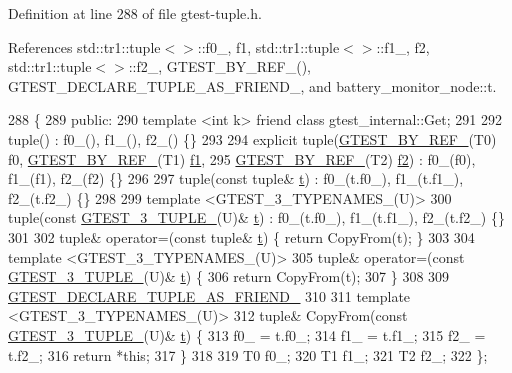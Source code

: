 Definition at line 288 of file gtest-\/tuple.\+h.



References std\+::tr1\+::tuple$<$$>$\+::f0\+\_\+, f1, std\+::tr1\+::tuple$<$$>$\+::f1\+\_\+, f2, std\+::tr1\+::tuple$<$$>$\+::f2\+\_\+, G\+T\+E\+S\+T\+\_\+\+B\+Y\+\_\+\+R\+E\+F\+\_\+(), G\+T\+E\+S\+T\+\_\+\+D\+E\+C\+L\+A\+R\+E\+\_\+\+T\+U\+P\+L\+E\+\_\+\+A\+S\+\_\+\+F\+R\+I\+E\+N\+D\+\_\+, and battery\+\_\+monitor\+\_\+node\+::t.


\begin{DoxyCode}
288                         \{
289  \textcolor{keyword}{public}:
290   \textcolor{keyword}{template} <\textcolor{keywordtype}{int} k> \textcolor{keyword}{friend} \textcolor{keyword}{class }gtest\_internal::Get;
291 
292   tuple() : f0\_(), f1\_(), f2\_() \{\}
293 
294   \textcolor{keyword}{explicit} tuple(\hyperlink{gtest-tuple_8h_adcf9057737a411d833fac0382c13a181}{GTEST\_BY\_REF\_}(T0) f0, \hyperlink{gtest-tuple_8h_adcf9057737a411d833fac0382c13a181}{GTEST\_BY\_REF\_}(T1) 
      \hyperlink{namespacestd_1_1tr1_a9c0fa65b105f8e2f58ba59ecf75fd000}{f1},
295       \hyperlink{gtest-tuple_8h_adcf9057737a411d833fac0382c13a181}{GTEST\_BY\_REF\_}(T2) \hyperlink{namespacestd_1_1tr1_a87dd9e009868361317f587126dba63d4}{f2}) : f0\_(f0), f1\_(f1), f2\_(f2) \{\}
296 
297   tuple(\textcolor{keyword}{const} tuple& \hyperlink{namespacebattery__monitor__node_a7a63d20d1ea461e280f4eb5b47f925cd}{t}) : f0\_(t.f0\_), f1\_(t.f1\_), f2\_(t.f2\_) \{\}
298 
299   \textcolor{keyword}{template} <GTEST\_3\_TYPENAMES\_(U)>
300   tuple(\textcolor{keyword}{const} \hyperlink{gtest-tuple_8h_af2c3eab3f1a5197b408fce44eb3ed9da}{GTEST\_3\_TUPLE\_}(U)& \hyperlink{namespacebattery__monitor__node_a7a63d20d1ea461e280f4eb5b47f925cd}{t}) : f0\_(t.f0\_), f1\_(t.f1\_), f2\_(t.f2\_) \{\}
301 
302   tuple& operator=(\textcolor{keyword}{const} tuple& \hyperlink{namespacebattery__monitor__node_a7a63d20d1ea461e280f4eb5b47f925cd}{t}) \{ \textcolor{keywordflow}{return} CopyFrom(t); \}
303 
304   \textcolor{keyword}{template} <GTEST\_3\_TYPENAMES\_(U)>
305   tuple& operator=(\textcolor{keyword}{const} \hyperlink{gtest-tuple_8h_af2c3eab3f1a5197b408fce44eb3ed9da}{GTEST\_3\_TUPLE\_}(U)& \hyperlink{namespacebattery__monitor__node_a7a63d20d1ea461e280f4eb5b47f925cd}{t}) \{
306     \textcolor{keywordflow}{return} CopyFrom(t);
307   \}
308 
309   \hyperlink{gtest-tuple_8h_a2b20671273f514a88a6e9b8328e5f257}{GTEST\_DECLARE\_TUPLE\_AS\_FRIEND\_}
310 
311   \textcolor{keyword}{template} <GTEST\_3\_TYPENAMES\_(U)>
312   tuple& CopyFrom(\textcolor{keyword}{const} \hyperlink{gtest-tuple_8h_af2c3eab3f1a5197b408fce44eb3ed9da}{GTEST\_3\_TUPLE\_}(U)& \hyperlink{namespacebattery__monitor__node_a7a63d20d1ea461e280f4eb5b47f925cd}{t}) \{
313     f0\_ = t.f0\_;
314     f1\_ = t.f1\_;
315     f2\_ = t.f2\_;
316     \textcolor{keywordflow}{return} *\textcolor{keyword}{this};
317   \}
318 
319   T0 f0\_;
320   T1 f1\_;
321   T2 f2\_;
322 \};
\end{DoxyCode}
